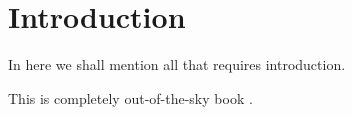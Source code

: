 \section{Introduction}

In here we shall mention all that requires introduction.

This is completely out-of-the-sky book \cite{jour}. 